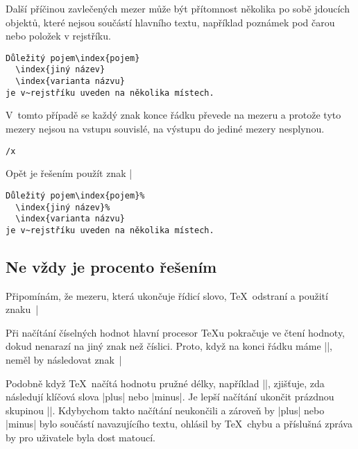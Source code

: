 \documentclass[oldcsbabel]{csbulletin}
\def\p#1{\texttt{\char`\\#1}}
\begin{document}
Další příčinou zavlečených mezer může být přítomnost několika po sobě jdoucích objektů, které nejsou součástí hlavního textu, například poznámek pod čarou nebo položek v rejstříku.
\begin{Verbatim}
Důležitý pojem\index{pojem}
  \index{jiný název}
  \index{varianta názvu}
je v~rejstříku uveden na několika místech.
\end{Verbatim}
V~tomto případě se každý znak konce řádku převede na mezeru a protože tyto mezery nejsou na vstupu souvislé, na výstupu do jediné mezery nesplynou.
\begingroup
\def\x{\hbox{\rm
Důležitý pojem\index{pojem}\
  \index{jiný název}\
  \index{varianta názvu}\
je v~rejstříku uveden na několika místech.
\unskip}}%
\begin{Verbatim}[commandchars=/()]
/x
\end{Verbatim}
\endgroup
\noindent
Opět je řešením použít znak |%
\begin{Verbatim}
Důležitý pojem\index{pojem}%
  \index{jiný název}%
  \index{varianta názvu}
je v~rejstříku uveden na několika místech.
\end{Verbatim}

\subsection{Ne vždy je procento řešením}

Připomínám, že mezeru, která ukončuje řídicí slovo, \TeX\ odstraní a použití znaku~|%

Při načítání číselných hodnot hlavní procesor \TeX u pokračuje ve čtení hodnoty, dokud nenarazí na jiný znak než číslici. Proto, když na konci řádku máme ||, neměl by následovat znak~|%

Podobně když \TeX\ načítá hodnotu pružné délky, například |\parskip=2pc|, zjišťuje, zda následují klíčová slova |plus| nebo |minus|. Je lepší načítání ukončit prázdnou skupinou |{}|. Kdybychom takto načítání neukončili a zároveň by |plus| nebo |minus| bylo součástí navazujícího textu, ohlásil by \TeX\ chybu a příslušná zpráva by pro uživatele byla dost matoucí.
\end{document}
